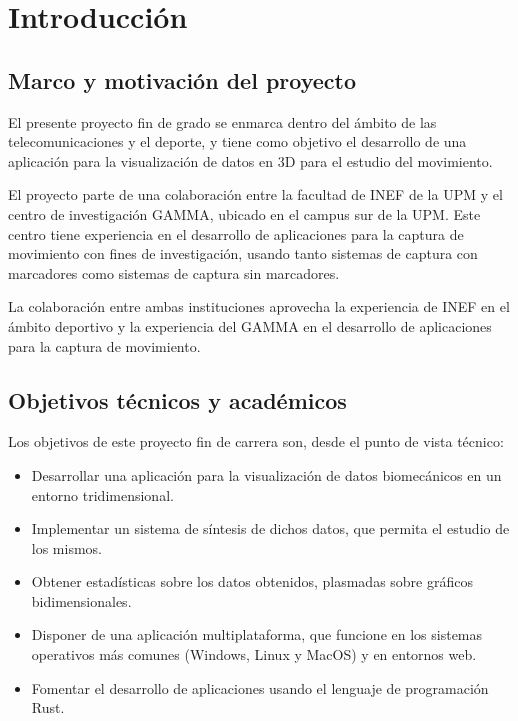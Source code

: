 \chapter{Introducción} \label{sec:cap1}

\section{Marco y motivación del proyecto}


\noindent El presente proyecto fin de grado se enmarca dentro del ámbito de las telecomunicaciones y el deporte, y tiene como objetivo el desarrollo de una aplicación para la visualización de datos en 3D para el estudio del movimiento.

El proyecto parte de una colaboración entre la facultad de \ac{INEF} de la \ac{UPM} y el centro de investigación \ac{GAMMA}, ubicado en el campus sur de la \ac{UPM}. Este centro tiene experiencia en el desarrollo de aplicaciones para la captura de movimiento con fines de investigación, usando tanto sistemas de captura con marcadores como sistemas de captura sin marcadores.

La colaboración entre ambas instituciones aprovecha la experiencia de \ac{INEF} en el ámbito deportivo y la experiencia del \ac{GAMMA} en el desarrollo de aplicaciones para la captura de movimiento.

\section{Objetivos técnicos y académicos}

Los objetivos de este proyecto fin de carrera son, desde el punto de vista técnico:

\begin{itemize}
    \item Desarrollar una aplicación para la visualización de datos biomecánicos en un entorno tridimensional.
    \item Implementar un sistema de síntesis de dichos datos, que permita el estudio de los mismos.
    \item Obtener estadísticas sobre los datos obtenidos, plasmadas sobre gráficos bidimensionales.
    \item Disponer de una aplicación multiplataforma, que funcione en los sistemas operativos más comunes (Windows, Linux y MacOS) y en entornos web.
    \item Fomentar el desarrollo de aplicaciones usando el lenguaje de programación Rust.
\end{itemize}

